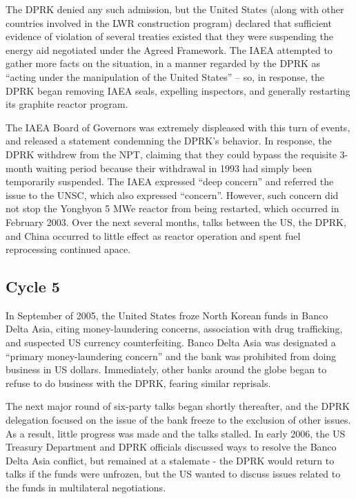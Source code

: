 \documentclass{article}
\begin{document}
The DPRK denied any such admission, but the United States (along with other countries involved in the LWR construction program) declared that sufficient evidence of violation of several treaties existed that they were suspending the energy aid negotiated under the Agreed Framework\cite{iaea09}. The IAEA attempted to gather more facts on the situation, in a manner regarded by the DPRK as “acting under the manipulation of the United States”\cite{hurriyet} – so, in response, the DPRK began removing IAEA seals, expelling inspectors, and generally restarting its graphite reactor program\cite{iaea09}.

The IAEA Board of Governors was extremely displeased with this turn of events, and released a statement condemning the DPRK’s behavior\cite{iaea03}. In response, the DPRK withdrew from the NPT, claiming that they could bypass the requisite 3-month waiting period because their withdrawal in 1993 had simply been temporarily suspended\cite{kcna4}. The IAEA expressed “deep concern” and referred the issue to the UNSC, which also expressed “concern”\cite{iaea09}. However, such concern did not stop the Yongbyon 5 MWe reactor from being restarted, which occurred in February 2003\cite{davenport}. Over the next several months, talks between the US, the DPRK, and China occurred to little effect as reactor operation and spent fuel reprocessing continued apace\cite{davenport}.

\subsection{Cycle 5}
In September of 2005, the United States froze North Korean funds in Banco Delta Asia, citing money-laundering concerns, association with drug trafficking, and suspected US currency counterfeiting\cite{davenport}. Banco Delta Asia was designated a “primary money-laundering concern” and the bank was prohibited from doing business in US dollars. Immediately, other banks around the globe began to refuse to do business with the DPRK, fearing similar reprisals\cite{greenlees}.

The next major round of six-party talks began shortly thereafter, and the DPRK delegation focused on the issue of the bank freeze to the exclusion of other issues\cite{greenlees}. As a result, little progress was made and the talks stalled. In early 2006, the US Treasury Department and DPRK officials discussed ways to resolve the Banco Delta Asia conflict, but remained at a stalemate - the DPRK would return to talks if the funds were unfrozen, but the US wanted to discuss issues related to the funds in multilateral negotiations\cite{greenlees}.
\end{document}

